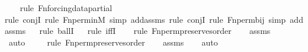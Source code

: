 \begin{isabellebody}
\ \ \ \isamarkupfalse%
{\isacharparenleft}{\kern0pt}rule\ Fn{\isacharunderscore}{\kern0pt}forcing{\isacharunderscore}{\kern0pt}data{\isacharunderscore}{\kern0pt}partial{\isacharparenright}{\kern0pt}\isanewline
\ \ \isamarkupfalse%
{\isacharparenleft}{\kern0pt}rule\ conjI{\isacharcomma}{\kern0pt}\ rule\ Fn{\isacharunderscore}{\kern0pt}perm{\isacharprime}{\kern0pt}{\isacharunderscore}{\kern0pt}in{\isacharunderscore}{\kern0pt}M{\isacharcomma}{\kern0pt}\ simp\ add{\isacharcolon}{\kern0pt}assms{\isacharcomma}{\kern0pt}\ rule\ conjI{\isacharcomma}{\kern0pt}\ rule\ Fn{\isacharunderscore}{\kern0pt}perm{\isacharprime}{\kern0pt}{\isacharunderscore}{\kern0pt}bij{\isacharcomma}{\kern0pt}\ simp\ add{\isacharcolon}{\kern0pt}assms{\isacharparenright}{\kern0pt}\isanewline
\ \ \isamarkupfalse%
{\isacharparenleft}{\kern0pt}rule\ ballI{\isacharparenright}{\kern0pt}{\isacharplus}{\kern0pt}\isanewline
\ \ \isamarkupfalse%
{\isacharparenleft}{\kern0pt}rule\ iffI{\isacharparenright}{\kern0pt}\isanewline
\ \ \ \isamarkupfalse%
{\isacharparenleft}{\kern0pt}rule\ Fn{\isacharunderscore}{\kern0pt}perm{\isacharprime}{\kern0pt}{\isacharunderscore}{\kern0pt}preserves{\isacharunderscore}{\kern0pt}order{\isacharparenright}{\kern0pt}\isanewline
\ \ \isamarkupfalse%
\ assms\isanewline
\ \ \ \ \ \ \isamarkupfalse%
\ auto{\isacharbrackleft}{\kern0pt}{}{\isacharbrackright}{\kern0pt}\isanewline
\ \ \ \ \isamarkupfalse%
{\isacharparenleft}{\kern0pt}rule\ Fn{\isacharunderscore}{\kern0pt}perm{\isacharprime}{\kern0pt}{\isacharunderscore}{\kern0pt}preserves{\isacharunderscore}{\kern0pt}order{\isacharprime}{\kern0pt}{\isacharparenright}{\kern0pt}\isanewline
\ \ \isamarkupfalse%
\ assms\isanewline
\ \ \isamarkupfalse%
\ auto%
\endisatagproof
{\isafoldproof}%
%
\isadelimproof
\isanewline
%
\endisadelimproof
\isanewline
\isanewline
{}\isamarkupfalse%
\isanewline
%
\isadelimtheory
%
\endisadelimtheory
%
\isatagtheory
{}\isamarkupfalse%
%
\endisatagtheory
{\isafoldtheory}%
%
\isadelimtheory
%
\endisadelimtheory
%
\end{isabellebody}%
\endinput
